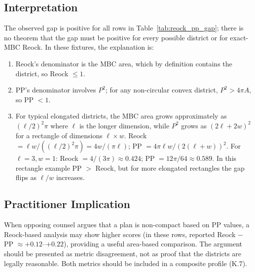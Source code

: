 \subsection{Interpretation}

The observed gap is positive for all rows in Table~\ref{tab:reock_pp_gap};
there is no theorem that the gap must be positive for every possible district
or for exact-MBC Reock.  In these fixtures, the explanation is:
\begin{enumerate}
  \item Reock's denominator is the MBC area, which by definition contains the district,
    so Reock $\leq 1$.
  \item PP's denominator involves $P^2$; for any non-circular convex district,
    $P^2 > 4\pi A$, so PP $< 1$.
  \item For typical elongated districts, the MBC area grows approximately as
    $(\ell/2)^2 \pi$ where $\ell$ is the longer dimension, while $P^2$ grows
    as $(2\ell + 2w)^2$ for a rectangle of dimensions $\ell \times w$.
    Reock $= \ell w / ((\ell/2)^2 \pi) = 4w/(\pi \ell)$;
    PP $= 4\pi \ell w / (2(\ell+w))^2$.
    For $\ell = 3, w = 1$: Reock $= 4/(3\pi) \approx 0.424$;
    PP $= 12\pi/64 \approx 0.589$.
    In this rectangle example PP $>$ Reock, but for more elongated rectangles
    the gap flips as $\ell/w$ increases.
\end{enumerate}

\subsection{Practitioner Implication}

When opposing counsel argues that a plan is non-compact based on PP values,
a Reock-based analysis may show higher scores (in these rows,
reported Reock $-$ PP $\approx +0.12$--$+0.22$), providing a useful area-based
comparison.  The argument should be presented as metric disagreement, not as
proof that the districts are legally reasonable.
Both metrics should be included in a composite profile (K.7).

